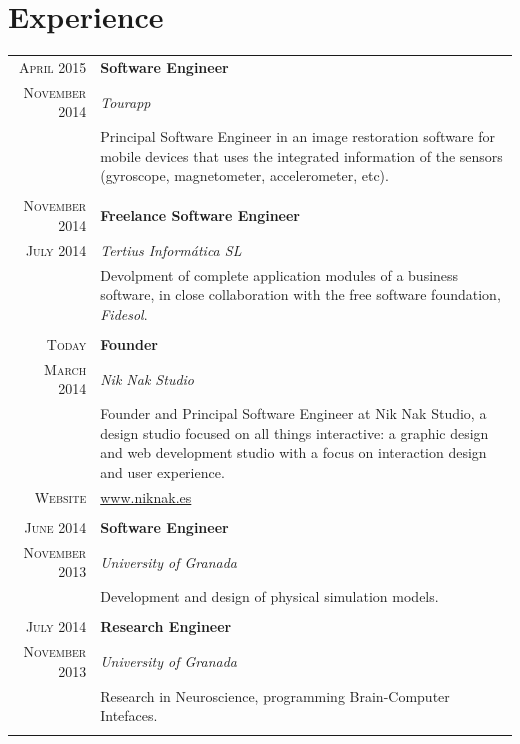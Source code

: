 \documentclass[a4paper,10pt]{article} %
\begin{document}
\section{Experience}

\begin{tabular}{r|p{11cm}}

\textsc{April 2015} & \textbf{Software Engineer} \\
\textsc{November 2014} & \emph{Tourapp}\\
& \footnotesize{Principal Software Engineer in an image restoration software for
mobile devices that uses the integrated information of the sensors
(gyroscope, magnetometer, accelerometer, etc).}  \\
\multicolumn{2}{c}{} \\

\textsc{November 2014} & \textbf{Freelance Software Engineer} \\
\textsc{July 2014} & \emph{Tertius Informática SL}\\
& \footnotesize{Devolpment of complete application modules of a
business software, in close collaboration with the free software foundation,
\textit{Fidesol}.}\\
\multicolumn{2}{c}{} \\

\textsc{Today} & \textbf{Founder} \\
\textsc{March 2014} & \emph{Nik Nak Studio}\\
& \footnotesize{Founder and Principal Software Engineer at Nik Nak Studio,  a
design studio focused on all things interactive: a graphic design and web 
development studio with a focus on interaction design and user experience.}\\
\textsc{Website} & \url{www.niknak.es} \\
\multicolumn{2}{c}{} \\

\textsc{June 2014} & \textbf{Software Engineer} \\
\textsc{November 2013} & \emph{University of Granada}\\
& \footnotesize{Development and design of physical simulation models.}\\
\multicolumn{2}{c}{} \\

\textsc{July 2014} & \textbf{Research Engineer} \\
\textsc{November 2013} & \emph{University of Granada}\\
& \footnotesize{Research in Neuroscience, programming Brain-Computer
Intefaces.}\\
\multicolumn{2}{c}{} \\

\end{tabular}
\end{document}
